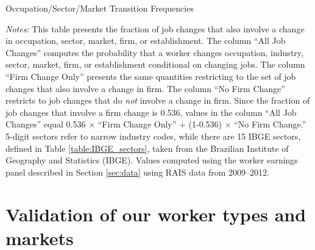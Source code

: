 \documentclass[12pt]{article}
\theoremstyle{definition}
\theoremstyle{plain}
\begin{document}
\begin{table}[h!] \centering
	\caption{Occupation/Sector/Market Transition Frequencies}
	\footnotesize\flushleft \emph{Notes:} This table presents the fraction of job changes that also involve a change in occupation, sector, market, firm, or establishment. The column ``All Job Changes'' computes the probability that a worker changes occupation, industry, sector, market, firm, or establishment conditional on changing jobs. The column ``Firm Change Only'' presents the same quantities restricting to the set of job changes that also involve a change in firm. The column ``No Firm Change'' restricts to job changes that do \emph{not} involve a change in firm. Since the fraction of job changes that involve a firm change is 0.536, values in the column ``All Job Changes'' equal 0.536 $\times$ ``Firm Change Only'' + (1-0.536) $\times$ ``No Firm Change.'' 5-digit sectors refer to narrow industry codes, while there are 15 IBGE sectors, defined in Table \ref{table:IBGE_sectors}, taken from the Brazilian Institute of Geography and Statistics (IBGE). Values computed using the worker earnings panel described in Section \ref{sec:data} using RAIS data from 2009--2012. 
	\label{table:transitions_table}
\end{table}



\section{Validation of our worker types and markets}
\label{sec:descriptive_results}
\end{document}
